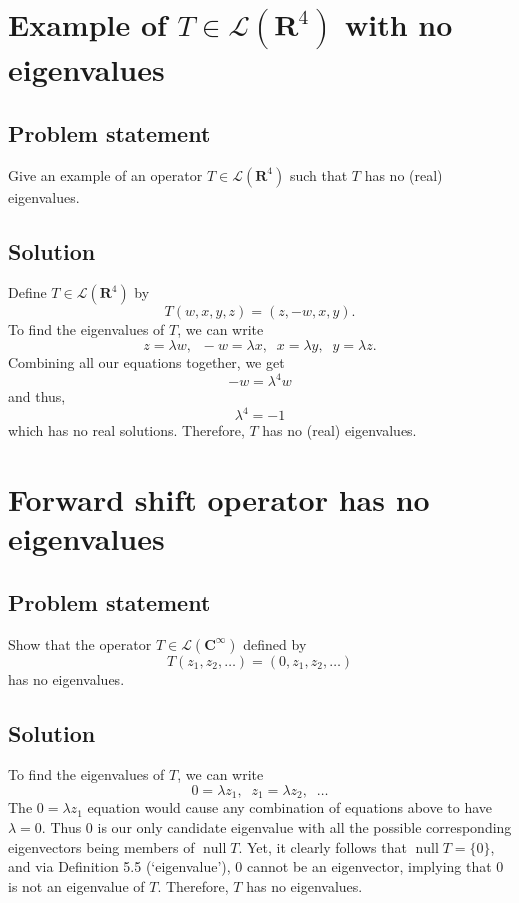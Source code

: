 \documentclass{article}
\begin{document}
\clearpage

\section{Example of $T\in\mathcal{L}(\mathbf{R}^4)$ with no eigenvalues}
\subsection*{Problem statement}
Give an example of an operator $T\in\mathcal{L}(\mathbf{R}^4)$ such that $T$ has no (real) eigenvalues.

\subsection*{Solution}
Define $T\in\mathcal{L}(\mathbf{R}^4)$ by
\[T(w,x,y,z)=(z,-w,x,y).\]
To find the eigenvalues of $T$, we can write
\[z=\lambda w, \;\; -w=\lambda x, \;\; x=\lambda y, \;\; y=\lambda z.\]
Combining all our equations together, we get
\[-w=\lambda^4  w\]
and thus,
\[\lambda^4=-1\]
which has no real solutions. 
Therefore, $T$ has no (real) eigenvalues.

\clearpage

\section{Forward shift operator has no eigenvalues}
\subsection*{Problem statement}
Show that the operator $T\in\mathcal{L}(\mathbf{C}^{\infty})$ defined by
\[T(z_1,z_2,\ldots)=(0,z_1,z_2,\ldots)\]
has no eigenvalues.

\subsection*{Solution}
To find the eigenvalues of $T$, we can write
\[0=\lambda z_1, \;\; z_1=\lambda z_2, \;\; \ldots\]
The $0=\lambda z_1$ equation would cause any combination of equations above to have $\lambda=0$. 
Thus $0$ is our only candidate eigenvalue with all the possible corresponding eigenvectors being members of $\operatorname{null}T$. 
Yet, it clearly follows that $\operatorname{null}T=\{0\}$, and via Definition 5.5 (`eigenvalue'), $0$ cannot be an eigenvector, implying that $0$ is not an eigenvalue of $T$. 
Therefore, $T$ has no eigenvalues.
\end{document}
